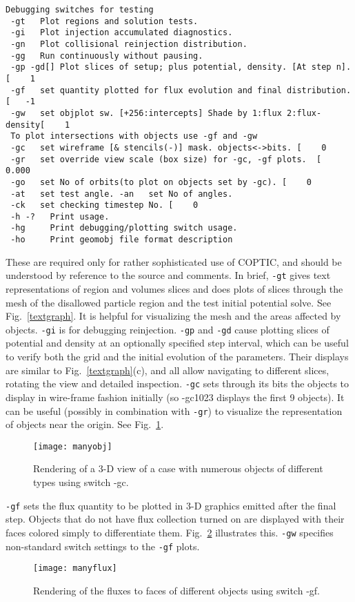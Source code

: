 \documentclass[12pt]{article}
\begin{document}
\begin{verbatim}
Debugging switches for testing
 -gt   Plot regions and solution tests.
 -gi   Plot injection accumulated diagnostics.
 -gn   Plot collisional reinjection distribution.
 -gg   Run continuously without pausing.
 -gp -gd[] Plot slices of setup; plus potential, density. [At step n]. [    1
 -gf   set quantity plotted for flux evolution and final distribution. [   -1
 -gw   set objplot sw. [+256:intercepts] Shade by 1:flux 2:flux-density[    1
 To plot intersections with objects use -gf and -gw
 -gc   set wireframe [& stencils(-)] mask. objects<->bits. [    0
 -gr   set override view scale (box size) for -gc, -gf plots.  [   0.000
 -go   set No of orbits(to plot on objects set by -gc). [    0
 -at   set test angle. -an   set No of angles. 
 -ck   set checking timestep No. [    0
 -h -?   Print usage.
 -hg     Print debugging/plotting switch usage.
 -ho     Print geomobj file format description
\end{verbatim}
These are required only for rather sophisticated use of COPTIC, and
should be understood by reference to the source and comments. In
brief, \verb!-gt! gives text representations of region and volumes
slices and does plots of slices through the mesh of the disallowed
particle region and the test initial potential solve. See Fig.\
\ref{textgraph}. It is helpful for visualizing the mesh and the areas
affected by objects. \verb!-gi! is for debugging
reinjection. \verb!-gp! and \verb!-gd! cause plotting slices of
potential and density at an optionally specified step interval, which
can be useful to verify both the grid and the initial evolution of the
parameters. Their displays are similar to Fig.\ \ref{textgraph}(c),
and all allow navigating to different slices, rotating the view and
detailed inspection. \verb!-gc! sets through its bits the objects to
display in wire-frame fashion initially (so -gc1023 displays the first
9 objects). It can be useful (possibly in combination with \verb!-gr!) to
visualize the representation of objects near the origin. See Fig.\
\ref{manyobj}. 
\begin{figure}[htp]
  \centering
  \texttt{[image: manyobj]}
  \caption{Rendering of a 3-D view of a case with numerous objects of
    different types using switch -gc.\label{manyobj}}
\end{figure}

\verb!-gf!  sets the flux quantity to be plotted in 3-D graphics
emitted after the final step. Objects that do not have flux collection
turned on are displayed with their faces colored simply to
differentiate them. Fig.\ \ref{manyflux} illustrates this. \verb!-gw! specifies non-standard switch settings
to the \verb!-gf! plots.
\begin{figure}[htp]
  \centering
  \texttt{[image: manyflux]}
  \caption{Rendering of the fluxes to faces of different objects using
    switch -gf.\label{manyflux}}
\end{figure}
\end{document}
